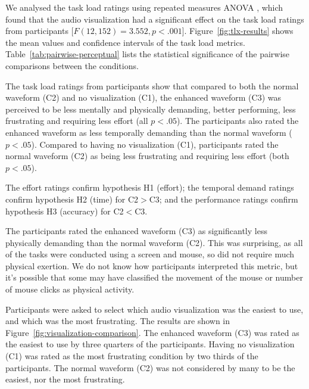 We analysed the task load ratings using repeated measures ANOVA \citep[p.~409]{Shalabh2009}, which found that the audio
visualization had a significant effect on the task load ratings from participants [$F(12,152)=3.552, p<.001$].
Figure~\ref{fig:tlx-results} shows the mean values and confidence intervals of the task load metrics.
Table~\ref{tab:pairwise-perceptual} lists the statistical significance of the pairwise comparisons between the
conditions.

The task load ratings from participants show that compared to both the normal waveform (C2) and no visualization (C1),
the enhanced waveform (C3) was perceived to be less mentally and physically demanding, better performing, less
frustrating and requiring less effort (all $p<.05$).  The participants also rated the enhanced waveform as less
temporally demanding than the normal waveform ($p<.05$).  Compared to having no visualization (C1), participants rated
the normal waveform (C2) as being less frustrating and requiring less effort (both $p<.05$). 

The effort ratings confirm hypothesis H1 (effort); the temporal demand ratings confirm hypothesis H2 (time) for
C2$>$C3; and the performance ratings confirm hypothesis H3 (accuracy) for C2$<$C3.



The participants rated the enhanced waveform (C3) as significantly less physically demanding than the normal waveform
(C2).  This was surprising, as all of the tasks were conducted using a screen and mouse, so did not require much
physical exertion.  We do not know how participants interpreted this metric, but it's possible that some may have
classified the movement of the mouse or number of mouse clicks as physical activity.

Participants were asked to select which audio visualization was the easiest to use, and which was the most frustrating.
The results are shown in Figure~\ref{fig:visualization-comparison}.  The enhanced waveform (C3) was rated as the
easiest to use by three quarters of the participants.  Having no visualization (C1) was rated as the most frustrating
condition by two thirds of the participants. The normal waveform (C2) was not considered by many to be the easiest, nor
the most frustrating.

